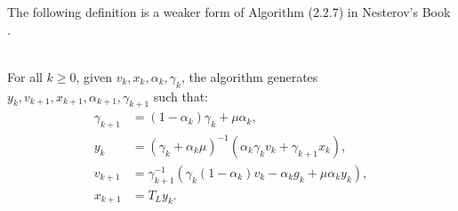 \documentclass[12pt]{article}
\begin{document}
    The following definition is a weaker form of Algorithm (2.2.7) in Nesterov's Book \cite{nesterov_lectures_2018}. 
    \begin{definition}\label{def:weak-apg}\;\\
        For all $k \ge 0$, given $v_k, x_k, \alpha_k, \gamma_k$, the algorithm generates $y_k, v_{k + 1}, x_{k + 1}, \alpha_{k + 1},\gamma_{k + 1}$ such that: 
        \begin{align*}
            \gamma_{k + 1} &= (1 - \alpha_k)\gamma_k + \mu \alpha_k, 
            \\
            y_k &= 
            (\gamma_k + \alpha_k \mu)^{-1}(\alpha_k \gamma_k v_k + \gamma_{k + 1}x_k), 
            \\
            v_{k + 1} &= \gamma_{k + 1}^{-1}
            (\gamma_k(1 - \alpha_k) v_k - \alpha_k g_k + \mu \alpha_k y_k), 
            \\
            x_{k + 1} &= T_L y_k. 
        \end{align*}
    \end{definition}
\end{document}
